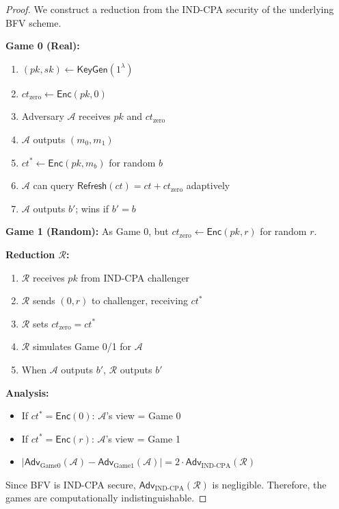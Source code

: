 \documentclass[11pt,a4paper]{article}
\begin{document}
\begin{proof}
We construct a reduction from the IND-CPA security of the underlying BFV scheme.

\textbf{Game 0 (Real):}
\begin{enumerate}
    \item $(pk, sk) \gets \mathsf{KeyGen}(1^\lambda)$
    \item $ct_{\text{zero}} \gets \mathsf{Enc}(pk, 0)$
    \item Adversary $\mathcal{A}$ receives $pk$ and $ct_{\text{zero}}$
    \item $\mathcal{A}$ outputs $(m_0, m_1)$
    \item $ct^* \gets \mathsf{Enc}(pk, m_b)$ for random $b$
    \item $\mathcal{A}$ can query $\mathsf{Refresh}(ct) = ct + ct_{\text{zero}}$ adaptively
    \item $\mathcal{A}$ outputs $b'$; wins if $b' = b$
\end{enumerate}

\textbf{Game 1 (Random):} As Game 0, but $ct_{\text{zero}} \gets \mathsf{Enc}(pk, r)$ for random $r$.

\textbf{Reduction $\mathcal{R}$:}
\begin{enumerate}
    \item $\mathcal{R}$ receives $pk$ from IND-CPA challenger
    \item $\mathcal{R}$ sends $(0, r)$ to challenger, receiving $ct^*$
    \item $\mathcal{R}$ sets $ct_{\text{zero}} = ct^*$
    \item $\mathcal{R}$ simulates Game 0/1 for $\mathcal{A}$
    \item When $\mathcal{A}$ outputs $b'$, $\mathcal{R}$ outputs $b'$
\end{enumerate}

\textbf{Analysis:}
\begin{itemize}
    \item If $ct^* = \mathsf{Enc}(0)$: $\mathcal{A}$'s view = Game 0
    \item If $ct^* = \mathsf{Enc}(r)$: $\mathcal{A}$'s view = Game 1
    \item $|\mathsf{Adv}_{\text{Game0}}(\mathcal{A}) - \mathsf{Adv}_{\text{Game1}}(\mathcal{A})| = 2 \cdot \mathsf{Adv}_{\text{IND-CPA}}(\mathcal{R})$
\end{itemize}

Since BFV is IND-CPA secure, $\mathsf{Adv}_{\text{IND-CPA}}(\mathcal{R})$ is negligible. Therefore, the games are computationally indistinguishable.
\end{proof}
\end{document}
